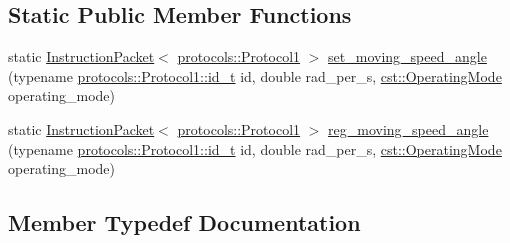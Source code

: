 \subsection*{Static Public Member Functions}
\begin{DoxyCompactItemize}
\item 
static \hyperlink{classdynamixel_1_1_instruction_packet}{Instruction\+Packet}$<$ \hyperlink{classdynamixel_1_1protocols_1_1_protocol1}{protocols\+::\+Protocol1} $>$ \hyperlink{classdynamixel_1_1servos_1_1_protocol_specific_packets_3_01_m_00_01protocols_1_1_protocol1_01_4_a7fa274b26149b617e54d490cc04db7d3}{set\+\_\+moving\+\_\+speed\+\_\+angle} (typename \hyperlink{classdynamixel_1_1protocols_1_1_protocol1_a1d4dfa22b01f80b1876d14f539d52b5c}{protocols\+::\+Protocol1\+::id\+\_\+t} id, double rad\+\_\+per\+\_\+s, \hyperlink{namespacedynamixel_1_1servos_1_1cst_ac17b5608f65c6495114d34f8efc4d809}{cst\+::\+Operating\+Mode} operating\+\_\+mode)
\item 
static \hyperlink{classdynamixel_1_1_instruction_packet}{Instruction\+Packet}$<$ \hyperlink{classdynamixel_1_1protocols_1_1_protocol1}{protocols\+::\+Protocol1} $>$ \hyperlink{classdynamixel_1_1servos_1_1_protocol_specific_packets_3_01_m_00_01protocols_1_1_protocol1_01_4_ab508a51888831c33bbd24dc05d8b2f99}{reg\+\_\+moving\+\_\+speed\+\_\+angle} (typename \hyperlink{classdynamixel_1_1protocols_1_1_protocol1_a1d4dfa22b01f80b1876d14f539d52b5c}{protocols\+::\+Protocol1\+::id\+\_\+t} id, double rad\+\_\+per\+\_\+s, \hyperlink{namespacedynamixel_1_1servos_1_1cst_ac17b5608f65c6495114d34f8efc4d809}{cst\+::\+Operating\+Mode} operating\+\_\+mode)
\end{DoxyCompactItemize}


\subsection{Member Typedef Documentation}
